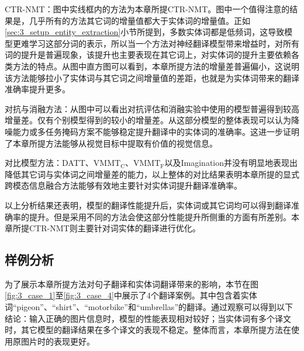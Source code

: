 {\sffamily CTR-NMT：}图中实线框内的方法为本章所提CTR-NMT。图中一个值得注意的结果是，几乎所有的方法其它词的增量值都大于实体词的增量值。正如\ref{sec:3_setup_entity_extraction}小节所提到，多数实体词都是低频词，这导致模型更难学习这部分词的表示，所以当一个方法对神经翻译模型带来增益时，对所有词的提升是普遍现象，该提升也主要表现在其它词上，对实体词的提升主要依赖各类方法的特点。从图中直方图可以看到，本章所提方法的增量差普遍偏小，这说明该方法能够拉小了实体词与其它词之间增量值的差距，也就是为实体词带来的翻译准确率提升更多。

{\sffamily 对抗与消融方法：}从图中可以看出对抗评估和消融实验中使用的模型普遍得到较高增量差。仅有个别模型得到的较小的增量差。从这部分模型的整体表现可以认为降噪能力或多任务掩码方案不能够稳定提升翻译中的实体词的准确率。这进一步证明了本章所提方法能够从视觉目标中提取有价值的视觉信息。

{\sffamily 对比模型方法：}DATT、$ \mathrm{VMMT_C} $、$ \mathrm{VMMT_F} $以及Imagination并没有明显地表现出降低其它词与实体词之间增量差的能力，以上整体的对比结果表明本章所提的显式跨模态信息融合方法能够有效地主要针对实体词提升翻译准确率。

以上分析结果还表明，模型的翻译性能提升后，实体词或其它词均可以得到翻译准确率的提升。但是采用不同的方法会使这部分性能提升所侧重的方面有所差别。本章所提CTR-NMT则主要针对词实体的翻译进行优化。

\subsection{样例分析}





为了展示本章所提方法对句子翻译和实体词翻译带来的影响，本节在图\ref{fig:3_case_1}至\ref{fig:3_case_4}中展示了4个翻译案例。其中包含着实体词“pigeon”、“shirt”、“motorbike”和“umbrellas”的翻译。通过观察可以得到以下结论：输入正确的图片信息时，模型的性能表现相对较好；当实体词有多个译文时，其它模型的翻译结果在多个译文的表现不稳定。整体而言，本章所提方法在使用原图片时的表现更好。